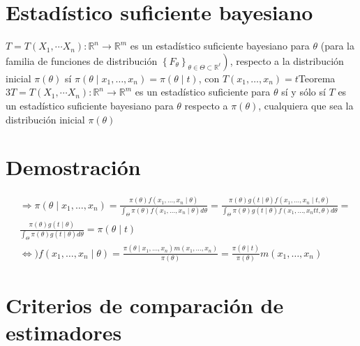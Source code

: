 \section*{Estadístico suficiente bayesiano}
$T=T\left(X_{1}, \cdots X_{n}\right): \mathbb{R}^{n} \longrightarrow \mathbb{R}^{m}$ es un estadístico suficiente bayesiano para $\theta$ (para la familia de funciones de distribución $\left.\left\{F_{\theta}\right\}_{\theta \in \Theta \subset \mathbb{R}^{\ell}}\right)$, respecto a la distribución inicial $\pi(\theta)$ sí $\pi\left(\theta \mid x_{1}, \ldots, x_{n}\right)=\pi(\theta \mid t)$, con $T\left(x_{1}, \ldots, x_{n}\right)=t$Teorema $3 T=T\left(X_{1}, \cdots X_{n}\right): \mathbb{R}^{n} \longrightarrow \mathbb{R}^{m}$ es un estadístico suficiente para $\theta$ sí y sólo sí $T$ es un estadístico suficiente bayesiano para $\theta$ respecto a $\pi(\theta)$, cualquiera que sea la distribución inicial $\pi(\theta)$

\section*{Demostración}
$$
  \begin{aligned}
     & \Rightarrow \pi\left(\theta \mid x_{1}, \ldots, x_{n}\right)=\frac{\pi(\theta) f\left(x_{1}, \ldots, x_{n} \mid \theta\right)}{\int_{\Theta} \pi(\theta) f\left(x_{1}, \ldots, x_{n} \mid \theta\right) d \theta}=\frac{\pi(\theta) g(t \mid \theta) f\left(x_{1}, \ldots, x_{n} \mid t, \theta\right)}{\int_{\Theta} \pi(\theta) g(t \mid \theta) f\left(x_{1}, \ldots, x_{n} t t, \theta\right) d \theta}= \\
     & \frac{\pi(\theta) g(t \mid \theta)}{\int_{\Theta} \pi(\theta) g(t \mid \theta) d \theta}=\pi(\theta \mid t)                                                                                                                                                                                                                                                                                                  \\
     & \Leftrightarrow) f\left(x_{1}, \ldots, x_{n} \mid \theta\right)=\frac{\pi\left(\theta \mid x_{1}, \ldots, x_{n}\right) m\left(x_{1}, \ldots, x_{n}\right)}{\pi(\theta)}=\frac{\pi(\theta \mid t)}{\pi(\theta)} m\left(x_{1}, \ldots, x_{n}\right)
  \end{aligned}
$$

\section*{Criterios de comparación de estimadores}
